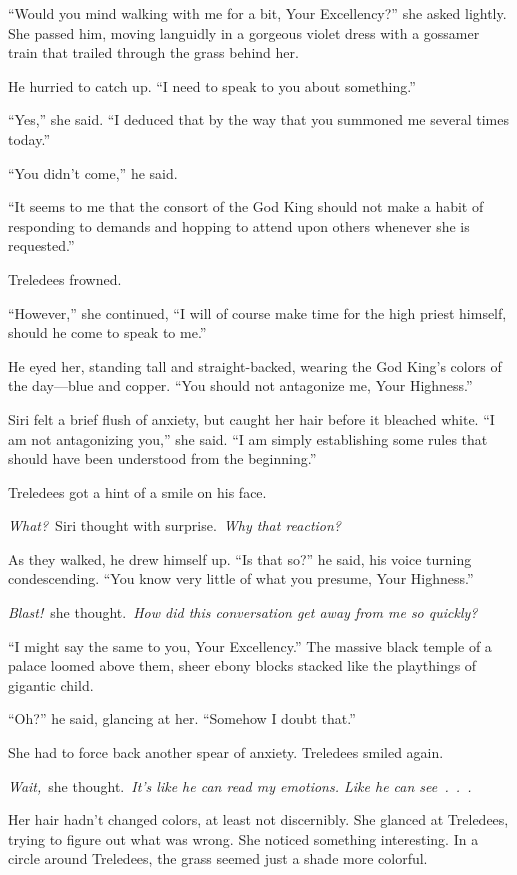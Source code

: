 “Would you mind walking with me for a bit, Your Excellency?” she asked lightly. She passed him, moving languidly in a gorgeous violet dress with a gossamer train that trailed through the grass behind her.

He hurried to catch up. “I need to speak to you about something.”

“Yes,” she said. “I deduced that by the way that you summoned me several times today.”

“You didn’t come,” he said.

“It seems to me that the consort of the God King should not make a habit of responding to demands and hopping to attend upon others whenever she is requested.”

Treledees frowned.

“However,” she continued, “I will of course make time for the high priest himself, should he come to speak to me.”

He eyed her, standing tall and straight-backed, wearing the God King’s colors of the day—blue and copper. “You should not antagonize me, Your Highness.”

Siri felt a brief flush of anxiety, but caught her hair before it bleached white. “I am not antagonizing you,” she said. “I am simply establishing some rules that should have been understood from the beginning.”

Treledees got a hint of a smile on his face.

\textit{What?}~Siri thought with surprise.~\textit{Why that reaction?}

As they walked, he drew himself up. “Is that so?” he said, his voice turning condescending. “You know very little of what you presume, Your Highness.”

\textit{Blast!}~she thought.~\textit{How did this conversation get away from me so quickly?}

“I might say the same to you, Your Excellency.” The massive black temple of a palace loomed above them, sheer ebony blocks stacked like the playthings of gigantic child.

“Oh?” he said, glancing at her. “Somehow I doubt that.”

She had to force back another spear of anxiety. Treledees smiled again.

\textit{Wait,}~she thought.~\textit{It’s like he can read my emotions. Like he can see~.~.~.}

Her hair hadn’t changed colors, at least not discernibly. She glanced at Treledees, trying to figure out what was wrong. She noticed something interesting. In a circle around Treledees, the grass seemed just a shade more colorful.

